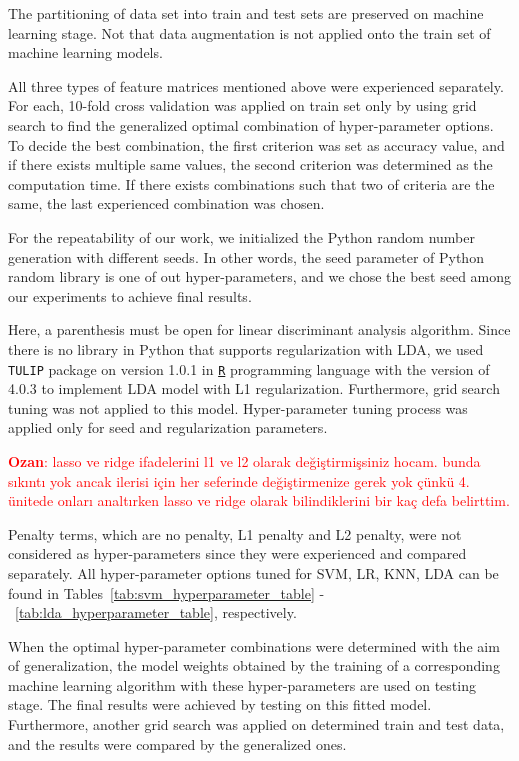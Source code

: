 The partitioning of data set into train and test sets are preserved on machine learning stage. Not that data augmentation is not applied onto the train set of machine learning models. 

All three types of feature matrices mentioned above were experienced separately. For each, 10-fold cross validation was applied on train set only by using grid search to find the generalized optimal combination of hyper-parameter options. To decide the best combination, the first criterion was set as accuracy value, and if there exists multiple same values, the second criterion was determined as the computation time. If there exists combinations such that two of criteria are the same, the last experienced combination was chosen. 

For the repeatability of our work, we initialized the Python random number generation with different seeds. In other words, the seed parameter of Python random library is one of out hyper-parameters, and we chose the best seed among our experiments to achieve final results.

Here, a parenthesis must be open for linear discriminant analysis algorithm. Since there is no library in Python that supports regularization with LDA, we used \texttt{TULIP} package \cite{TULIP_package} on version 1.0.1 in \href{https://cran.r-project.org/bin/windows/base/old/4.0.3/}{\texttt{R}} programming language with the version of 4.0.3 to implement LDA model with L1 regularization. Furthermore, grid search tuning was not applied to this model. Hyper-parameter tuning process was applied only for seed and regularization parameters.

\textcolor{red}{\textbf{Ozan}: lasso ve ridge ifadelerini l1 ve l2 olarak değiştirmişsiniz hocam. bunda sıkıntı yok ancak ilerisi için her seferinde değiştirmenize gerek yok çünkü 4. ünitede onları analtırken lasso ve ridge olarak bilindiklerini bir kaç defa belirttim.}

Penalty terms, which are no penalty, L1 penalty and L2 penalty, were not considered as hyper-parameters since they were experienced and compared separately. All hyper-parameter options tuned for SVM, LR, KNN, LDA can be found in Tables~\ref{tab:svm_hyperparameter_table} -~\ref{tab:lda_hyperparameter_table}, respectively.

When the optimal hyper-parameter combinations were determined with the aim of generalization, the model weights obtained by the training of a corresponding machine learning algorithm with these hyper-parameters are used on testing stage. The final results were achieved by testing on this fitted model. Furthermore, another grid search was applied on determined train and test data, and the results were compared by the generalized ones.

